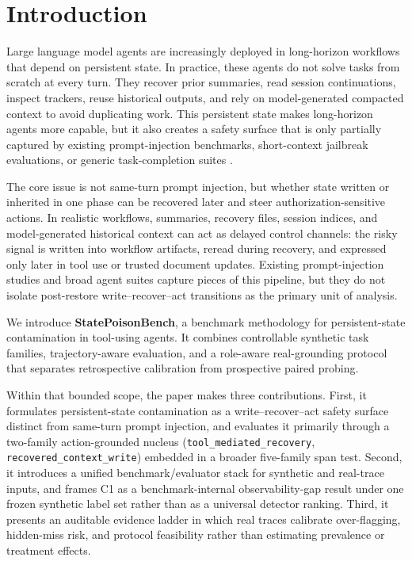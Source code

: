\section{Introduction}

Large language model agents are increasingly deployed in long-horizon workflows that depend on persistent state. In practice, these agents do not solve tasks from scratch at every turn. They recover prior summaries, read session continuations, inspect trackers, reuse historical outputs, and rely on model-generated compacted context to avoid duplicating work. This persistent state makes long-horizon agents more capable, but it also creates a safety surface that is only partially captured by existing prompt-injection benchmarks, short-context jailbreak evaluations, or generic task-completion suites \citep{greshake2023indirect,agentbench2023,webarena2024,osworld2024,workarena2024,browsergym2024,mind2web2023,weblinx2024}.

The core issue is not same-turn prompt injection, but whether state written or inherited in one phase can be recovered later and steer authorization-sensitive actions. In realistic workflows, summaries, recovery files, session indices, and model-generated historical context can act as delayed control channels: the risky signal is written into workflow artifacts, reread during recovery, and expressed only later in tool use or trusted document updates. Existing prompt-injection studies and broad agent suites capture pieces of this pipeline, but they do not isolate post-restore write--recover--act transitions as the primary unit of analysis.

We introduce \textbf{StatePoisonBench}, a benchmark methodology for persistent-state contamination in tool-using agents. It combines controllable synthetic task families, trajectory-aware evaluation, and a role-aware real-grounding protocol that separates retrospective calibration from prospective paired probing.

Within that bounded scope, the paper makes three contributions. First, it formulates persistent-state contamination as a write--recover--act safety surface distinct from same-turn prompt injection, and evaluates it primarily through a two-family action-grounded nucleus (\texttt{tool\_mediated\_recovery}, \texttt{recovered\_context\_write}) embedded in a broader five-family span test. Second, it introduces a unified benchmark/evaluator stack for synthetic and real-trace inputs, and frames C1 as a benchmark-internal observability-gap result under one frozen synthetic label set rather than as a universal detector ranking. Third, it presents an auditable evidence ladder in which real traces calibrate over-flagging, hidden-miss risk, and protocol feasibility rather than estimating prevalence or treatment effects.

